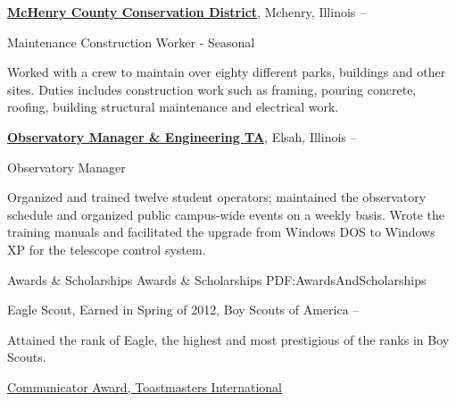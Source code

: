 \documentclass[a4paper,MMMyyyy,nonstopmode]{simpleresumecv}
\begin{document}
\begin{Body}

\href{http://www.mccdistrict.org/rccms/}
{\textbf{
McHenry County Conservation District}},
Mchenry, Illinois
\hfill {} --

\Gap
\BulletItem
Maintenance Construction Worker - Seasonal 
\begin{Detail}
\SubBulletItem
Worked with a crew to maintain over eighty different parks, buildings and other sites. Duties includes construction work such as framing, pouring concrete, roofing, building structural maintenance and electrical work.
\Gap
\end{Detail}


\href{http://www.mccdistrict.org/rccms/}
{\textbf{Observatory Manager \& Engineering TA}},
Elsah, Illinois
\hfill
{} --

\Gap
\BulletItem
Observatory Manager

\begin{Detail}
\SubBulletItem
Organized and trained twelve student operators; maintained the observatory schedule and organized public campus-wide events on a weekly basis.
\SubBulletItem
Wrote the training manuals and facilitated the upgrade from Windows DOS to Windows XP for the telescope control system.
\end{Detail}


\Section
{Awards \&\newline
Scholarships}
{Awards \& Scholarships}
{PDF:AwardsAndScholarships}

\BulletItem
Eagle Scout,
Earned in Spring of 2012,
Boy Scouts of America
\hfill
{} --
\begin{Detail}
\Item
Attained the rank of Eagle, the highest and most prestigious of the ranks in Boy Scouts.
\end{Detail}

\Gap
\BulletItem
\href{https://www.toastmasters.org/Education/Communication-Track}{Communicator Award,
Toastmasters International}
\hfill
{}




\end{Body}
\end{document}
